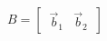 \documentclass[preview]{standalone}
\begin{document}
\begin{align*}
B = \begin{bmatrix} \, \vec{b}_1 & \vec{b}_2 \, \end{bmatrix}
\end{align*}
\end{document}
